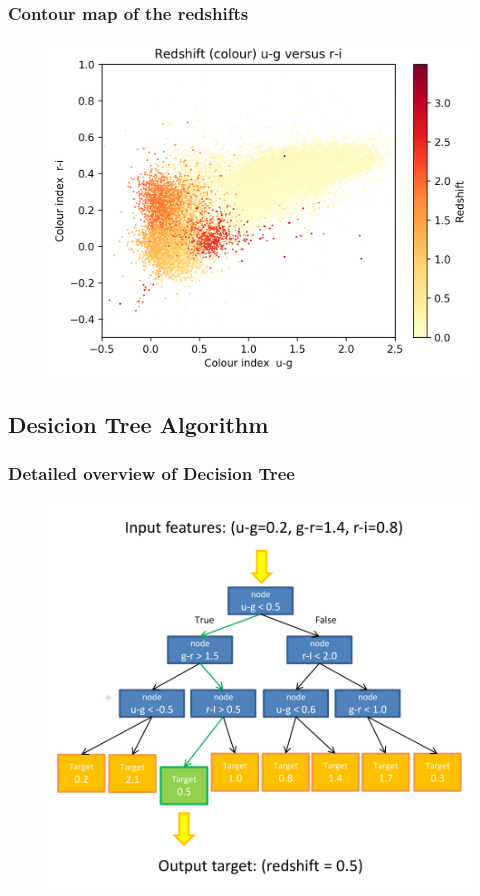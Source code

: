 \documentclass{beamer}
\begin{document}
\begin{frame}
	\frametitle{Contour map of the redshifts}
    \begin{figure}
        \includegraphics[scale=0.18]{img/redshiftug.png}
    \end{figure}
    \end{frame}
\subsection{Desicion Tree Algorithm}
\begin{frame}
	\frametitle{Detailed overview of Decision Tree}
    \begin{figure}
        \includegraphics[scale=0.25]{img/decision_tree.png}
    \end{figure}
    \end{frame}
\end{document}
